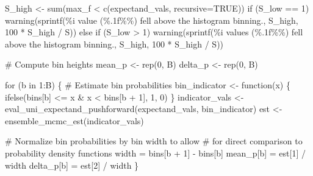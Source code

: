 \documentclass[
  letterpaper,
  DIV=11,
  numbers=noendperiod]{scrartcl}
\newenvironment{Shaded}{\begin{snugshade}}{\end{snugshade}}
\newcommand{\BuiltInTok}[1]{\textcolor[rgb]{0.00,0.23,0.31}{#1}}
\newcommand{\CommentTok}[1]{\textcolor[rgb]{0.37,0.37,0.37}{#1}}
\newcommand{\ControlFlowTok}[1]{\textcolor[rgb]{0.00,0.23,0.31}{#1}}
\newcommand{\DecValTok}[1]{\textcolor[rgb]{0.68,0.00,0.00}{#1}}
\newcommand{\KeywordTok}[1]{\textcolor[rgb]{0.00,0.23,0.31}{#1}}
\newcommand{\NormalTok}[1]{\textcolor[rgb]{0.00,0.23,0.31}{#1}}
\newcommand{\OperatorTok}[1]{\textcolor[rgb]{0.37,0.37,0.37}{#1}}
\newcommand{\SpecialCharTok}[1]{\textcolor[rgb]{0.37,0.37,0.37}{#1}}
\newcommand{\StringTok}[1]{\textcolor[rgb]{0.13,0.47,0.30}{#1}}
\begin{document}
\begin{Shaded}
\begin{Highlighting}[]
\NormalTok{  S\_high }\OperatorTok{\textless{}{-}} \BuiltInTok{sum}\NormalTok{(max\_f }\OperatorTok{\textless{}}\NormalTok{ c(expectand\_vals, recursive}\OperatorTok{=}\NormalTok{TRUE))}
  \ControlFlowTok{if}\NormalTok{ (S\_low }\OperatorTok{==} \DecValTok{1}\NormalTok{)}
\NormalTok{    warning(sprintf(}\StringTok{\textquotesingle{}}\SpecialCharTok{\%i}\StringTok{ value (}\SpecialCharTok{\%.1f\%\%}\StringTok{) fell above the histogram binning.\textquotesingle{}}\NormalTok{,}
\NormalTok{                    S\_high, }\DecValTok{100} \OperatorTok{*}\NormalTok{ S\_high }\OperatorTok{/}\NormalTok{ S))}
  \ControlFlowTok{else} \ControlFlowTok{if}\NormalTok{ (S\_low }\OperatorTok{\textgreater{}} \DecValTok{1}\NormalTok{)}
\NormalTok{    warning(sprintf(}\StringTok{\textquotesingle{}}\SpecialCharTok{\%i}\StringTok{ values (}\SpecialCharTok{\%.1f\%\%}\StringTok{) fell above the histogram binning.\textquotesingle{}}\NormalTok{,}
\NormalTok{                    S\_high, }\DecValTok{100} \OperatorTok{*}\NormalTok{ S\_high }\OperatorTok{/}\NormalTok{ S))}

  \CommentTok{\# Compute bin heights}
\NormalTok{  mean\_p }\OperatorTok{\textless{}{-}}\NormalTok{ rep(}\DecValTok{0}\NormalTok{, B)}
\NormalTok{  delta\_p }\OperatorTok{\textless{}{-}}\NormalTok{ rep(}\DecValTok{0}\NormalTok{, B)}

  \ControlFlowTok{for}\NormalTok{ (b }\KeywordTok{in} \DecValTok{1}\NormalTok{:B) \{}
    \CommentTok{\# Estimate bin probabilities}
\NormalTok{    bin\_indicator }\OperatorTok{\textless{}{-}}\NormalTok{ function(x) \{}
\NormalTok{      ifelse(bins[b] }\OperatorTok{\textless{}=}\NormalTok{ x }\OperatorTok{\&}\NormalTok{ x }\OperatorTok{\textless{}}\NormalTok{ bins[b }\OperatorTok{+} \DecValTok{1}\NormalTok{], }\DecValTok{1}\NormalTok{, }\DecValTok{0}\NormalTok{)}
\NormalTok{    \}}
\NormalTok{    indicator\_vals }\OperatorTok{\textless{}{-}}\NormalTok{ eval\_uni\_expectand\_pushforward(expectand\_vals,}
\NormalTok{                                                     bin\_indicator)}
\NormalTok{    est }\OperatorTok{\textless{}{-}}\NormalTok{ ensemble\_mcmc\_est(indicator\_vals)}

    \CommentTok{\# Normalize bin probabilities by bin width to allow}
    \CommentTok{\# for direct comparison to probability density functions}
\NormalTok{    width }\OperatorTok{=}\NormalTok{ bins[b }\OperatorTok{+} \DecValTok{1}\NormalTok{] }\OperatorTok{{-}}\NormalTok{ bins[b]}
\NormalTok{    mean\_p[b] }\OperatorTok{=}\NormalTok{ est[}\DecValTok{1}\NormalTok{] }\OperatorTok{/}\NormalTok{ width}
\NormalTok{    delta\_p[b] }\OperatorTok{=}\NormalTok{ est[}\DecValTok{2}\NormalTok{] }\OperatorTok{/}\NormalTok{ width}
\NormalTok{  \}}


\end{Highlighting}
\end{Shaded}
\end{document}
